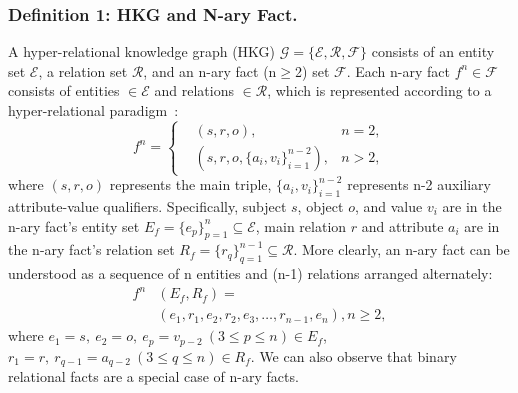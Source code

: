 \documentclass[letterpaper]{article} \usepackage{aaai23}  \usepackage{times}  \usepackage{helvet}  \usepackage{courier}  \usepackage[hyphens]{url}  \usepackage{graphicx} \urlstyle{rm} \def\UrlFont{\rm}  \usepackage{natbib}  \usepackage{caption} \frenchspacing  \setlength{\pdfpagewidth}{8.5in}  \setlength{\pdfpageheight}{11in}  \usepackage{algorithm}
\begin{document}
\subsubsection{Definition 1: HKG and N-ary Fact.} 
A hyper-relational knowledge graph (HKG)
$\mathcal{G}=\{\mathcal{E},\mathcal{R},\mathcal{F}\}$ consists of an entity set $\mathcal{E}$, a relation set $\mathcal{R}$, and an n-ary fact (n$\geq$2) set $\mathcal{F}$. Each n-ary fact $f^n \in \mathcal{F}$ consists of entities $\in \mathcal{E}$ and relations $\in \mathcal{R}$, which is represented according to a hyper-relational paradigm~\citep{HINGE}:
\begin{equation}
\label{eq1}
f^n=\left\{
\begin{aligned}
&(s,r,o)  , & n=2, \\
&(s,r,o,\{a_i,v_i\}_{i=1}^{n-2})  , & n>2,
\end{aligned}
\right.
\end{equation}
where $(s,r,o)$ represents the main triple, $\{a_i,v_i\}^{n-2}_{i=1}$ represents n-2 auxiliary attribute-value qualifiers. Specifically, subject $s$, object $o$, and value $v_i$ are in the n-ary fact's entity set $E_f=\{e_p\}_{p=1}^n\subseteq\mathcal{E}$, main relation $r$ and attribute $a_i$ are in the n-ary fact's relation set $ R_f=\{r_q\}_{q=1}^{n-1}\subseteq\mathcal{R}$. More clearly, an n-ary fact can be understood as a sequence of n entities and (n-1) relations arranged alternately:
\begin{equation}
\begin{aligned}
f^n&(E_f,R_f)=\\&(e_1,r_1,e_2,r_2,e_3,\ldots,r_{n-1},e_{n}), n\geq2,
\end{aligned}
\label{eqfn}
\end{equation}
where $e_1=s,\ e_2=o,\ e_{p}=v_{p-2}\ (3\leq p\leq n) \in E_f$, $r_1=r,\ r_{q-1}=a_{q-2}\ (3\leq q\leq n) \in R_f$. We can also observe that binary relational facts are a special case of n-ary facts.
\end{document}
